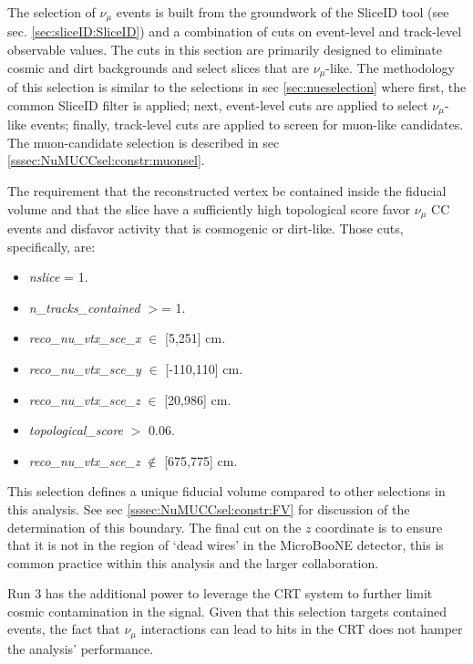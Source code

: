 \par The selection of $\nu_{\mu}$ events is built from the groundwork of the SliceID tool (see sec. \ref{sec:sliceID:SliceID}) and a combination of cuts on event-level and track-level observable values. The cuts in this section are primarily designed to eliminate cosmic and dirt backgrounds and select slices that are $\nu_{\mu}$-like. The methodology of this selection is similar to the selections in sec \ref{sec:nueselection} where first, the common SliceID filter is applied; next, event-level cuts are applied to select $\nu_{\mu}$-like events; finally, track-level cuts are applied to screen for muon-like candidates. The muon-candidate selection is described in sec \ref{sssec:NuMUCCsel:constr:muonsel}.

\par The requirement that the reconstructed vertex be contained inside the fiducial volume and that the slice have a sufficiently high topological score favor $\nu_{\mu}$ CC events and disfavor activity that is cosmogenic or dirt-like. Those cuts, specifically, are:

\begin{itemize}
    \item \emph{nslice} = 1.
    \item \emph{n\_tracks\_contained} $>$= 1.
    \item \emph{reco\_nu\_vtx\_sce\_x} $\in$ [5,251] cm.
    \item \emph{reco\_nu\_vtx\_sce\_y} $\in$ [-110,110] cm.
    \item \emph{reco\_nu\_vtx\_sce\_z} $\in$ [20,986] cm.
    \item \emph{topological\_score} $>$ 0.06.
    \item \emph{reco\_nu\_vtx\_sce\_z} $\not\in$ [675,775] cm.
\end{itemize}

\par \noindent This selection defines a unique fiducial volume compared to other selections in this analysis. See sec \ref{sssec:NuMUCCsel:constr:FV} for discussion of the determination of this boundary. The final cut on the $z$ coordinate is to ensure that it is not in the region of `dead wires' in the MicroBooNE detector, this is common practice within this analysis and the larger collaboration.

\par \noindent Run 3 has the additional power to leverage the CRT system to further limit cosmic contamination in the signal. Given that this selection targets contained events, the fact that $\nu_{\mu}$ interactions can lead to hits in the CRT does not hamper the analysis' performance.

